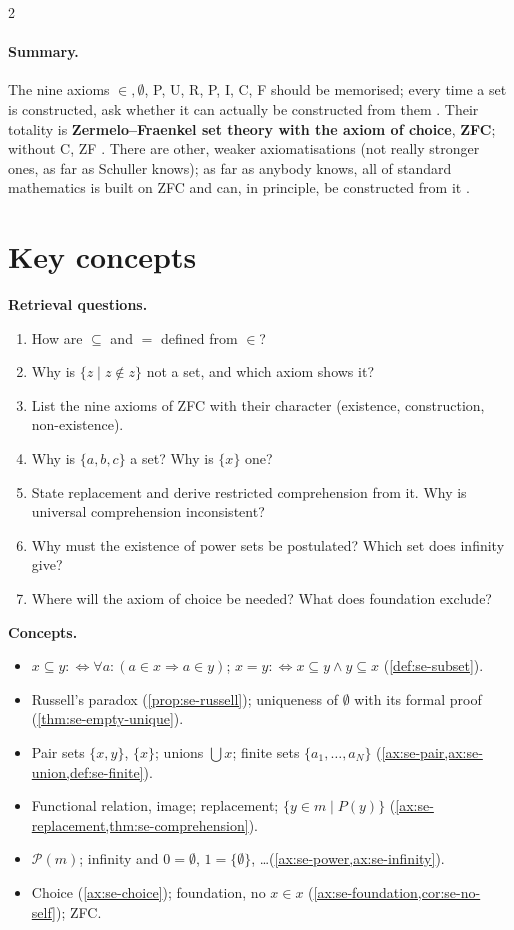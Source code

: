 \begin{paracol}{2}
\paragraph{Summary.} The nine axioms $\in,\emptyset$, P, U, R, P, I, C, F should be memorised; every time a set is
constructed, ask whether it can actually be constructed from them . Their totality is
\textbf{Zermelo--Fraenkel set theory with the axiom of choice}, \textbf{ZFC}; without C, ZF .
There are other, weaker axiomatisations (not really stronger ones, as far as Schuller knows); as far as anybody knows,
all of standard mathematics is built on ZFC and can, in principle, be constructed from it
.

\section*{Key concepts}
\begin{keyconcepts}
\textbf{Retrieval questions.}
\begin{enumerate}
  \item How are $\subseteq$ and $=$ defined from $\in$?
  \item Why is $\{z\mid z\notin z\}$ not a set, and which axiom shows it?
  \item List the nine axioms of ZFC with their character (existence, construction, non-existence).
  \item Why is $\{a,b,c\}$ a set? Why is $\{x\}$ one?
  \item State replacement and derive restricted comprehension from it. Why is universal comprehension inconsistent?
  \item Why must the existence of power sets be postulated? Which set does infinity give?
  \item Where will the axiom of choice be needed? What does foundation exclude?
\end{enumerate}
\textbf{Concepts.}
\begin{itemize}
  \item $x\subseteq y:\Leftrightarrow\forall a\colon(a\in x\Rightarrow a\in y)$; $x=y:\Leftrightarrow x\subseteq y\wedge y\subseteq x$ (\cref{def:se-subset}).
  \item Russell's paradox (\cref{prop:se-russell}); uniqueness of $\emptyset$ with its formal proof (\cref{thm:se-empty-unique}).
  \item Pair sets $\{x,y\}$, $\{x\}$; unions $\bigcup x$; finite sets $\{a_1,\dots,a_N\}$ (\cref{ax:se-pair,ax:se-union,def:se-finite}).
  \item Functional relation, image; replacement; $\{y\in m\mid P(y)\}$ (\cref{ax:se-replacement,thm:se-comprehension}).
  \item $\mathcal P(m)$; infinity and $0=\emptyset$, $1=\{\emptyset\}$, \dots (\cref{ax:se-power,ax:se-infinity}).
  \item Choice (\cref{ax:se-choice}); foundation, no $x\in x$ (\cref{ax:se-foundation,cor:se-no-self}); ZFC.
\end{itemize}
\end{keyconcepts}

\flushside
\end{paracol}
